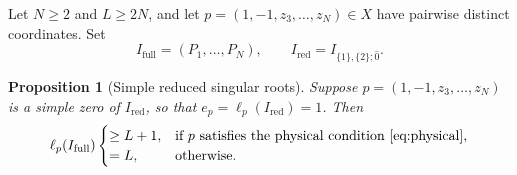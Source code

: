 \documentclass[11pt]{article}
\newtheorem{proposition}{Proposition}[section]
\theoremstyle{definition}
\begin{document}
Let $N\ge 2$ and $L\ge 2N$, and let
$p=(1,-1,z_3,\ldots,z_N)\in X$ have pairwise distinct coordinates. Set
\[
I_{\mathrm{full}}=(P_1,\ldots,P_N),\qquad
I_{\mathrm{red}}=I_{\{1\},\{2\};\hat{0}}.
\]

\begin{proposition}[Simple reduced singular roots]
\label{prop:simple-reduced-one-pair}
	Suppose $p=(1,-1,z_3,\ldots,z_N)$ is a simple zero of
	$I_{\mathrm{red}}$, so that $e_p=\ell_p(I_{\mathrm{red}})=1$. Then
	\[
	\ell_p(I_{\mathrm{full}})
	\begin{cases}
		\ge L+1, & \text{if }p\text{ satisfies the physical condition~\eqref{eq:physical}},\\
		=L, & \text{otherwise}.
	\end{cases}
	\]
\end{proposition}
\end{document}
